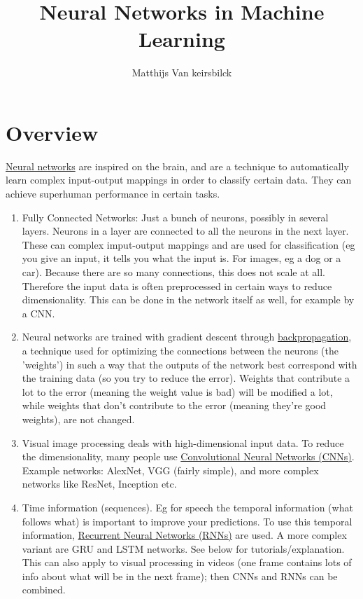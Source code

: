 \documentclass[]{article}
\title{Neural Networks in Machine Learning}
\author{Matthijs Van keirsbilck}
\begin{document}
\maketitle

\section{Overview}
\href{https://en.wikipedia.org/wiki/Artificial_neural_network}{Neural networks} are inspired on the brain, and are a technique to automatically learn complex input-output mappings in order to classify certain data. They can achieve superhuman performance in certain tasks.
\begin{enumerate}
	\item Fully Connected Networks: Just a bunch of neurons, possibly in several layers. Neurons in a layer are connected to all the neurons in the next layer. These can complex imput-output mappings and are used for classification (eg you give an input, it tells you what the input is. For images, eg a dog or a car). Because there are so many connections, this does not scale at all. Therefore the input data is often preprocessed in certain ways to reduce dimensionality. This can be done in the network itself as well, for example by a CNN.
	
	\item Neural networks are trained with gradient descent through \href{https://en.wikipedia.org/wiki/Backpropagation}{backpropagation}, a technique used for optimizing the connections between the neurons (the 'weights') in such a way that the outputs of the network best correspond with the training data (so you try to reduce the error). Weights that contribute a lot to the error (meaning the weight value is bad) will be modified a lot, while weights that don't contribute to the error (meaning they're good weights), are not changed.
	
	\item Visual image processing deals with high-dimensional input data. To reduce the dimensionality, many people use \href{https://en.wikipedia.org/wiki/Convolutional_neural_network}{Convolutional Neural Networks (CNNs)}. Example networks: AlexNet, VGG (fairly simple), and more complex networks like ResNet, Inception etc.
	
	\item Time information (sequences). Eg for speech the temporal information (what follows what) is important to improve your predictions. To use this temporal information, \href{https://en.wikipedia.org/wiki/Recurrent_neural_network}{Recurrent Neural Networks (RNNs)} are used. A more complex variant are GRU and LSTM networks. See below for tutorials/explanation. This can also apply to visual processing in videos (one frame contains lots of info about what will be in the next frame); then CNNs and RNNs can be combined.
\end{enumerate}
\pagebreak
\end{document}
